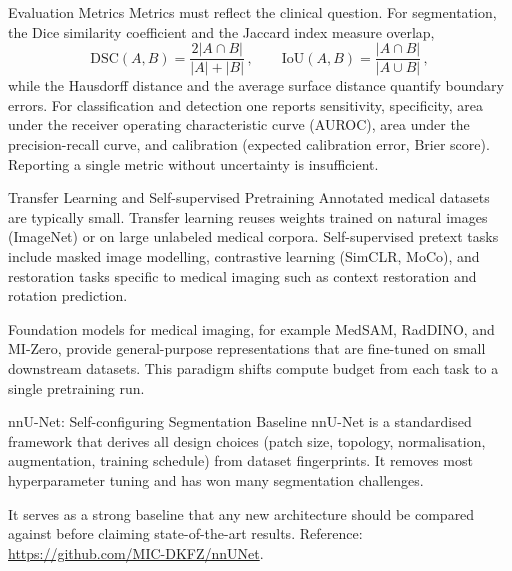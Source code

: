 \begin{frame}{Evaluation Metrics}
    Metrics must reflect the clinical question. For segmentation, the Dice similarity coefficient and the Jaccard index measure overlap,
    \begin{equation*}
        \mathrm{DSC}(A, B) = \frac{2|A \cap B|}{|A| + |B|}\,,\qquad \mathrm{IoU}(A, B) = \frac{|A \cap B|}{|A \cup B|}\,,
    \end{equation*}
    while the Hausdorff distance and the average surface distance quantify boundary errors. For classification and detection one reports sensitivity, specificity, area under the receiver operating characteristic curve (AUROC), area under the precision-recall curve, and calibration (expected calibration error, Brier score). Reporting a single metric without uncertainty is insufficient.
\end{frame}

\begin{frame}{Transfer Learning and Self-supervised Pretraining}
    Annotated medical datasets are typically small. Transfer learning reuses weights trained on natural images (ImageNet) or on large unlabeled medical corpora. Self-supervised pretext tasks include masked image modelling, contrastive learning (SimCLR, MoCo), and restoration tasks specific to medical imaging such as context restoration and rotation prediction.

    Foundation models for medical imaging, for example MedSAM, RadDINO, and MI-Zero, provide general-purpose representations that are fine-tuned on small downstream datasets. This paradigm shifts compute budget from each task to a single pretraining run.
\end{frame}

\begin{frame}{nnU-Net: Self-configuring Segmentation Baseline}
    nnU-Net is a standardised framework that derives all design choices (patch size, topology, normalisation, augmentation, training schedule) from dataset fingerprints. It removes most hyperparameter tuning and has won many segmentation challenges.
    \begin{center}
    \end{center}
    It serves as a strong baseline that any new architecture should be compared against before claiming state-of-the-art results. Reference: \url{https://github.com/MIC-DKFZ/nnUNet}.
\end{frame}

